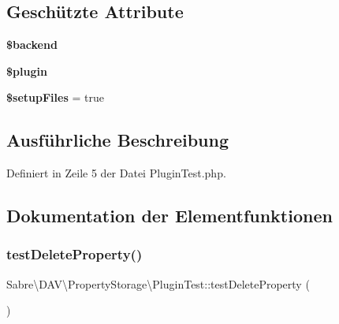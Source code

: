 \subsection*{Geschützte Attribute}
\begin{DoxyCompactItemize}
\item 
\mbox{\label{class_sabre_1_1_d_a_v_1_1_property_storage_1_1_plugin_test_a43fb7bb07297756fcce02a0c443d067c}} 
{\bfseries \$backend}
\item 
\mbox{\label{class_sabre_1_1_d_a_v_1_1_property_storage_1_1_plugin_test_a8019a2f41947bd0473eb7c0264b3d16d}} 
{\bfseries \$plugin}
\item 
\mbox{\label{class_sabre_1_1_d_a_v_1_1_property_storage_1_1_plugin_test_a0347dbf6cb7af99b224543bae7325eb2}} 
{\bfseries \$setup\+Files} = true
\end{DoxyCompactItemize}


\subsection{Ausführliche Beschreibung}


Definiert in Zeile 5 der Datei Plugin\+Test.\+php.



\subsection{Dokumentation der Elementfunktionen}
\mbox{\label{class_sabre_1_1_d_a_v_1_1_property_storage_1_1_plugin_test_af77c3f91efcc66d0b1c851d8f3ac793a}} 
\subsubsection{\texorpdfstring{test\+Delete\+Property()}{testDeleteProperty()}}
{\footnotesize\ttfamily Sabre\textbackslash{}\+D\+A\+V\textbackslash{}\+Property\+Storage\textbackslash{}\+Plugin\+Test\+::test\+Delete\+Property (\begin{DoxyParamCaption}{ }\end{DoxyParamCaption})}

